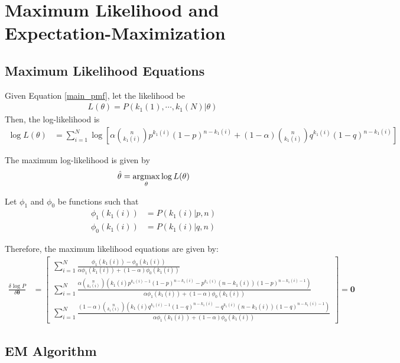 \section{Maximum Likelihood and Expectation-Maximization}

\subsection{Maximum Likelihood Equations}
Given Equation \ref{main_pmf}, let the likelihood be
\begin{align*}
L(\mathbb{\theta}) = P(k_1(1), \cdots, k_1(N) | \mathbb{\theta})\ 
\end{align*}
Then, the log-likelihood is
\begin{align*}
\log L(\mathbb{\theta}) &= \sum_{i=1}^{N} \log \left[ \alpha \binom{n}{k_1(i)} p^{k_1(i)} (1-p)^{n - k_1(i)} + (1-\alpha) \binom{n}{k_1(i)} q^{k_1(i)} (1-q)^{n - k_1(i)}  \right] 
\end{align*}

The maximum log-likelihood is given by
\begin{align*}
\hat{\theta} = \operatorname*{\arg\!\max}_{\theta} \log L(\mathbb{\theta})
\end{align*}

Let $\phi_1$ and $\phi_0$ be functions such that
\begin{align*}
\phi_1(k_1(i)) &= P(k_1(i) | p,n)\\
\phi_0(k_1(i)) &= P(k_1(i) | q,n)
\end{align*}

Therefore, the maximum likelihood equations are given by:
\begin{align*}
\frac{\delta \log P}{\delta \mathbf{\theta}} &= \begin{bmatrix} 
\sum_{i=1}^{N} \frac{\phi_1(k_1(i)) - \phi_0(k_1(i))}{\alpha \phi_1(k_1(i)) + (1-\alpha)\phi_0(k_1(i))} \\ 
\sum_{i=1}^{N} \frac{\alpha \binom{n}{k_1(i)} \left( k_1(i) p^{k_1(i)-1} (1-p)^{n-k_1(i)} - p^{k_1(i)} (n-k_1(i)) (1-p)^{n-k_1(i)-1} \right) }{\alpha \phi_1(k_1(i)) + (1-\alpha)\phi_0(k_1(i))} \\ 
\sum_{i=1}^{N} \frac{(1-\alpha) \binom{n}{k_1(i)} \left( k_1(i) q^{k_1(i)-1} (1-q)^{n-k_1(i)} - q^{k_1(i)} (n-k_1(i)) (1-q)^{n-k_1(i)-1} \right) }{\alpha \phi_1(k_1(i)) + (1-\alpha)\phi_0(k_1(i))} \end{bmatrix} = \mathbf{0}
\end{align*}

\subsection{EM Algorithm}

